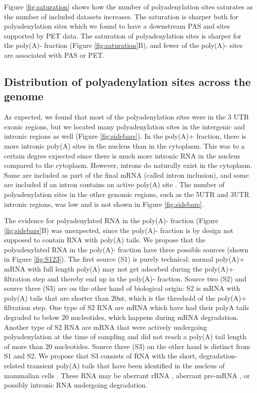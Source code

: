 Figure \ref{fig:saturation} shows how the number of polyadenylation sites
saturates as the number of included datasets increases. The saturation is
sharper both for polyadenylation sites which we found to have a downstream
PAS and sites supported by PET data. The saturation of polyadenylation sites is
sharper for the poly(A)- fraction (Figure \ref{fig:saturation}B), and fewer of
the poly(A)- sites are associated with PAS or PET.

\subsection{Distribution of polyadenylation sites across the genome}
As expected, we found that most of the polyadenylation sites were in the 3\p
UTR exonic regions, but we located many polyadenylation sites in the intergenic
and intronic regions as well (Figure \ref{fig:sidebars}). In the poly(A)+
fraction, there is more intronic poly(A) sites in the nucleus than in the
cytoplasm. This was to a certain degree expected since there is much more
intronic RNA in the nucleus compared to the cytoplasm. However, introns do
naturally exist in the cytoplasm. Some are included as part of the final mRNA
(called intron inclusion), and some are included if an intron contains an
active poly(A) site \cite{tian_widespread_2007}. The number of polyadenylation
sites in the other genomic regions, such as the 5\p UTR and 3\p UTR intronic
regions, was low and is not shown in Figure \ref{fig:sidebars}.

The evidence for polyadenylated RNA in the poly(A)- fraction (Figure
\ref{fig:sidebars}B) was unexpected, since the poly(A)- fraction is by design
not supposed to contain RNA with poly(A) tails. We propose that the
polyadenylated RNA in the poly(A)- fraction have three possible sources (shown
in Figure \ref{fig:S123}). The first source (S1) is purely technical: normal
poly(A)+ mRNA with full length poly(A) may not get adsorbed during the poly(A)+
filtration step and thereby end up in the poly(A)- fraction. Source two (S2)
and source three (S3) are on the other hand of biological origin: S2 is mRNA
with poly(A) tails that are shorter than 20nt, which is the threshold of the
poly(A)+ filtration step. One type of S2 RNA are mRNA which have had their
polyA tails degraded to below 20 nucleotides, which happens during mRNA
degradation. Another type of S2 RNA are mRNA that were actively undergoing
polyadenylation at the time of sampling and did not reach a poly(A) tail length
of more than 20 nucleotides. Source three (S3) on the other hand is distinct
from S1 and S2. We propose that S3 consists of RNA with the short,
degradation-related transient poly(A) tails that have been identified in the
nucleus of mammalian cells \cite{lemay_nuclear_2010}. These RNA may be aberrant
rRNA \cite{shcherbik_polyadenylation_2010}, aberrant pre-mRNA
\cite{west_adenylation_2006}, or possibly intronic RNA undergoing degradation.

